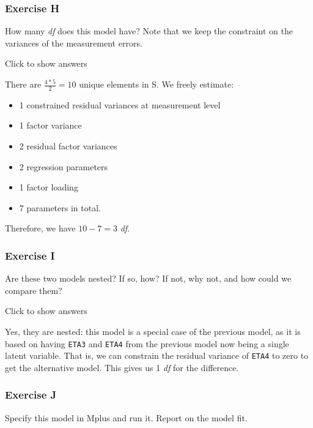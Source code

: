 \documentclass[
]{book}
\providecommand{\tightlist}{%
  \setlength{\itemsep}{0pt}\setlength{\parskip}{0pt}}
\begin{document}
\hypertarget{exercise-h}{%
\subsubsection*{Exercise H}\label{exercise-h}}

How many \emph{df} does this model have? Note that we keep the constraint on the variances of the measurement errors.

Click to show answers

There are \(\frac{4*5}{2} = 10\) unique elements in S. We freely estimate:

\begin{itemize}
\tightlist
\item
  1 constrained residual variances at measurement level
\item
  1 factor variance
\item
  2 residual factor variances
\item
  2 regression parameters
\item
  1 factor loading
\item
  7 parameters in total.
\end{itemize}

Therefore, we have \(10 - 7 = 3\) \emph{df}.

\hypertarget{exercise-i}{%
\subsubsection*{Exercise I}\label{exercise-i}}

Are these two models nested? If so, how? If not, why not, and how could we compare them?

Click to show answers

Yes, they are nested: this model is a special case of the previous model, as it is based on having \texttt{ETA3} and \texttt{ETA4} from the previous model now being a single latent variable. That is, we can constrain the residual variance of \texttt{ETA4} to zero to get the alternative model. This gives us 1 \emph{df} for the difference.

\hypertarget{exercise-j}{%
\subsubsection*{Exercise J}\label{exercise-j}}

Specify this model in Mplus and run it. Report on the model fit.
\end{document}
